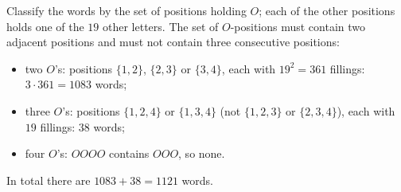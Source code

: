Classify the words by the set of positions holding $O$; each of the other positions holds one of the $19$ other letters. The set of $O$-positions must contain two adjacent positions and must not contain three consecutive positions:
\begin{itemize}
\item two $O$'s: positions $\{1,2\}$, $\{2,3\}$ or $\{3,4\}$, each with $19^2=361$ fillings: $3\cdot361=1083$ words;
\item three $O$'s: positions $\{1,2,4\}$ or $\{1,3,4\}$ (not $\{1,2,3\}$ or $\{2,3,4\}$), each with $19$ fillings: $38$ words;
\item four $O$'s: $OOOO$ contains $OOO$, so none.
\end{itemize}
In total there are $1083+38=\boxed{1121}$ words.
